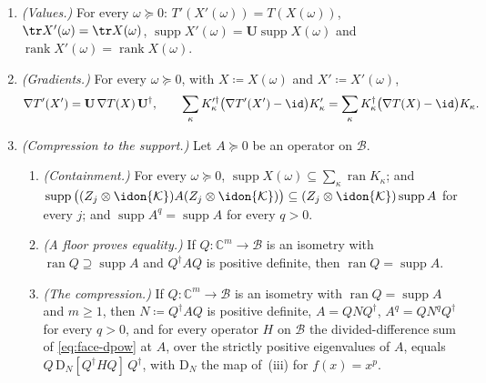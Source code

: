 \begin{lemma}
\begin{enumerate}[label=(\roman*),leftmargin=2.4em]
  Hence $X'(\omega)=\mathbf UX(\omega)\mathbf U^{\dagger}$, with
  $\operatorname{supp}X(\omega)\subseteq\mathcal{W}$, for every
  $\omega\succeq0$.
\item \emph{(Values.)} For every $\omega\succeq0$:
  $T'(X'(\omega))=T(X(\omega))$, $\tr X'(\omega)=\tr X(\omega)$,
  $\operatorname{supp}X'(\omega)=\mathbf U\operatorname{supp}X(\omega)$ and
  $\operatorname{rank}X'(\omega)=\operatorname{rank}X(\omega)$.
\item \emph{(Gradients.)} For every $\omega\succeq0$, with $X\coloneqq
  X(\omega)$ and $X'\coloneqq X'(\omega)$,
  \begin{equation}\label{eq:kraus-gradient}
    \nabla T'(X')=\mathbf U\,\nabla T(X)\,\mathbf U^{\dagger},
    \qquad
    \sum_{\kappa}K'^{\dagger}_{\kappa}\big(\nabla T'(X')-\id\big)K'_{\kappa}
    =\sum_{\kappa}K^{\dagger}_{\kappa}\big(\nabla T(X)-\id\big)K_{\kappa}.
  \end{equation}
\item \emph{(Compression to the support.)} Let $A\succeq0$ be an operator
  on $\mathcal{B}$.
  \begin{enumerate}[label=(\alph*),leftmargin=2.2em]
  \item \emph{(Containment.)} For every $\omega\succeq0$,
    $\operatorname{supp}X(\omega)\subseteq\sum_{\kappa}\operatorname{ran}K_{\kappa}$;
    and $\operatorname{supp}\big((Z_j\otimes\idon{\mathcal{K}})A
    (Z_j\otimes\idon{\mathcal{K}})\big)\subseteq(Z_j\otimes\idon{\mathcal{K}})
    \operatorname{supp}A$ for every $j$; and
    $\operatorname{supp}A^{q}=\operatorname{supp}A$ for every $q>0$.
  \item \emph{(A floor proves equality.)} If $Q:\mathbb{C}^{m}\to\mathcal{B}$
    is an isometry with $\operatorname{ran}Q\supseteq\operatorname{supp}A$
    and $Q^{\dagger}AQ$ is positive definite, then
    $\operatorname{ran}Q=\operatorname{supp}A$.
  \item \emph{(The compression.)} If $Q:\mathbb{C}^{m}\to\mathcal{B}$ is an
    isometry with $\operatorname{ran}Q=\operatorname{supp}A$ and $m\ge1$, then
    $N\coloneqq Q^{\dagger}AQ$ is positive definite, $A=QNQ^{\dagger}$,
    $A^{q}=QN^{q}Q^{\dagger}$ for every $q>0$, and for every operator $H$ on
    $\mathcal{B}$ the divided-difference sum of \eqref{eq:face-dpow} at $A$,
    over the strictly positive eigenvalues of $A$, equals
    $Q\,\mathrm{D}_N[Q^{\dagger}HQ]\,Q^{\dagger}$, with $\mathrm{D}_N$ the
    map of \,(iii) for
    $f(x)=x^{p}$.
  \end{enumerate}

\end{enumerate}
\end{lemma}
